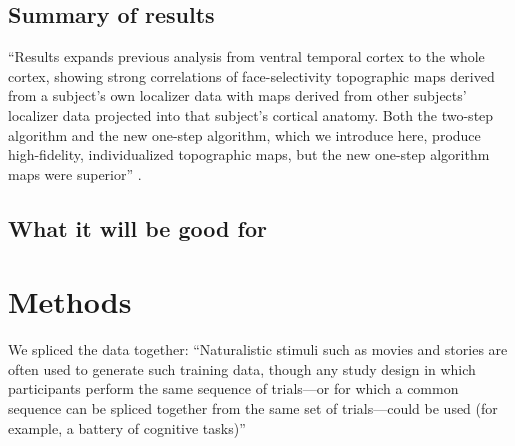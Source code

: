 \subsection{Summary of results}


%
``Results expands previous analysis from ventral temporal cortex to the whole
cortex, showing strong correlations of face-selectivity topographic maps derived
from a subject's own localizer data with maps derived from other subjects'
localizer data projected into that subject's cortical anatomy. Both the two-step
algorithm and the new one-step algorithm, which we introduce here, produce
high-fidelity, individualized topographic maps, but the new one-step algorithm
maps were superior'' \citep{jiahui2020predicting}.


\subsection{What it will be good for}





\section{Methods}






We spliced the data together: ``Naturalistic stimuli such as movies and stories
are often used to generate such training data, though any study design in which
participants perform the same sequence of trials—or for which a common sequence
can be spliced together from the same set of trials—could be used (for example,
a battery of cognitive tasks)'' \citep{cohen2017computational}

